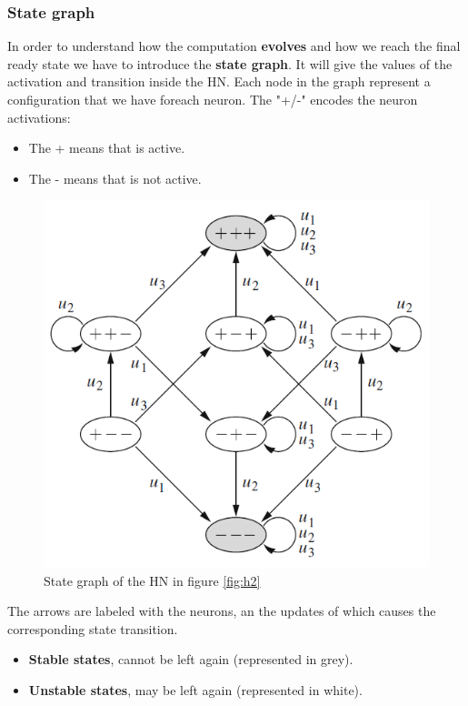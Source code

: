 \documentclass{article}
\begin{document}
\subsubsection{State graph}
In order to understand how the computation \textbf{evolves} and how we reach the final ready state we have
to introduce the \textbf{state graph}. It will give the values of the activation and
transition inside the HN. Each node in the graph represent a configuration that we
have foreach neuron. The "+/-" encodes the neuron activations:
\begin{itemize}
    \item The + means that is active.
    \item The - means that is not active.
\end{itemize}
\begin{figure}[H]
    \centering
    \includegraphics[scale=0.5]{images/state_graph.png}
    \caption{State graph of the HN in figure \ref{fig:h2}}
\end{figure}
The arrows are labeled with the neurons, an the updates of which causes the corresponding state transition.
\begin{itemize}
    \item \textbf{Stable states}, cannot be left again (represented in grey).
    \item \textbf{Unstable states}, may be left again (represented in white).
\end{itemize}
\end{document}
